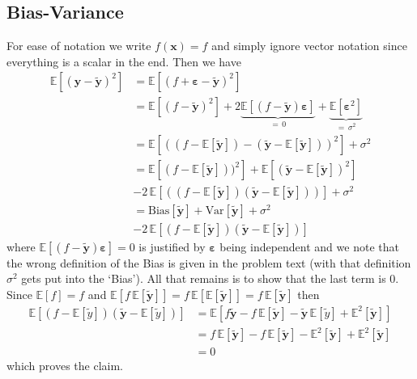 \documentclass[%
reprint,
amsmath,amssymb,
aps,
pra,
]{revtex4-2}
\begin{document}
\subsection{Bias-Variance}
For ease of notation we write $f(\bm x)=f$ and simply ignore vector notation since everything is a scalar in the end. Then we have
\begin{align*}
	\mathbb{E}[(\bm y-\tilde{\bm y})^2]&=\mathbb{E}[(f+\bm\varepsilon-\tilde{\bm y})^2]\\
	&=\mathbb{E}[(f-\tilde{\bm y})^2]+2\underbrace{\mathbb{E}[(f-\tilde{\bm y})\bm\varepsilon]}_{=\,0}+\underbrace{\mathbb{E}[\bm\varepsilon^2]}_{=\,\sigma^2}\\
	&=\mathbb{E}[((f-\mathbb{E}[\tilde{\bm y}])-(\tilde{\bm y}-\mathbb{E}[\tilde{\bm y}]))^2]+\sigma^2\\
	&=\mathbb{E}[(f-\mathbb{E}[\tilde{\bm y}]))^2]+\mathbb{E}[(\tilde{\bm y}-\mathbb{E}[\tilde{\bm y}])^2]\\
	&-2\,\mathbb{E}[((f-\mathbb{E}[\tilde{\bm y}])(\tilde{\bm y}-\mathbb{E}[\tilde{\bm y}]))]+\sigma^2\\
	&=\text{Bias}[\tilde{\bm y}]+\text{Var}[\tilde{\bm y}]+\sigma^2\\
	&-2\,\mathbb{E}[(f-\mathbb{E}[\tilde{\bm y}])(\tilde{\bm y}-\mathbb{E}[\tilde{\bm y}])]
\end{align*}
where $\mathbb{E}[(f-\tilde{\bm y})\bm\varepsilon]=0$ is justified by $\bm\varepsilon$ being independent and we note that the wrong definition of the Bias is given in the problem text (with that definition $\sigma^2$ gets put into the `Bias'). All that remains is to show that the last term is 0. Since $\mathbb{E}[f]=f$ and $\mathbb{E}[f\,\mathbb{E}[\tilde{\bm y}]]=f\,\mathbb{E}[\mathbb{E}[\tilde{\bm y}]]=f\,\mathbb{E}[\tilde{\bm y}]$ then
\begin{align*}
	\mathbb{E}[(f-\mathbb{E}[\tilde y])(\tilde{\bm y}-\mathbb{E}[\tilde y])]&=\mathbb{E}[f\tilde{\bm y}-f\,\mathbb{E}[\tilde{\bm y}]-\tilde{\bm y}\,\mathbb{E}[\tilde y]+\mathbb{E}^2[\tilde{\bm y}]]\\
	&=f\,\mathbb{E}[\tilde{\bm y}]-f\,\mathbb{E}[\tilde{\bm y}]-\mathbb{E}^2[\tilde{\bm y}]+\mathbb{E}^2[\tilde{\bm y}]\\
	&=0
\end{align*}
which proves the claim. 
	
\end{document}
